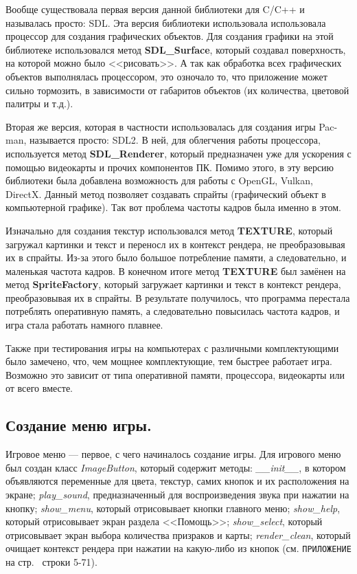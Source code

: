 Вообще существовала первая версия данной библиотеки для C/C++ и называлась просто: SDL. Эта версия библиотеки использовала использовала процессор для создания графических объектов.
Для создания графики на этой библиотеке использовался метод \textbf{SDL\_Surface}, который создавал поверхность, на которой можно было <<рисовать>>. А так как обработка всех графических объектов выполнялась процессором, это озночало то, что приложение может сильно тормозить, в зависимости от габаритов объектов (их количества, цветовой палитры и т.д.).

Вторая же версия, которая в частности использовалась для создания игры Pac-man, называется просто: SDL2. В ней, для облегчения работы процессора, используется метод \textbf{SDL\_Renderer},
который предназначен уже для ускорения с помощью видеокарты и прочих компонентов ПК. Помимо этого, в эту версию библиотеки была добавлена возможность для работы с OpenGL, Vulkan, DirectX.
Данный метод позволяет создавать спрайты (графический объект в компьютерной графике). Так вот проблема частоты кадров была именно в этом.

Изначально для создания текстур использовался метод \textbf{TEXTURE}, который загружал картинки и текст и переносл их в контекст рендера, не преобразовывая их в спрайты. Из-за этого было большое
потребление памяти, а следовательно, и маленькая частота кадров. В конечном итоге метод \textbf{TEXTURE} был замёнен на метод \textbf{SpriteFactory}, который загружает картинки и текст в контекст рендера, преобразовывая их в спрайты. В результате получилось, что программа перестала потреблять оперативную память, а следовательно повысилась частота кадров, и игра стала работать намного плавнее.

Также при тестирования игры на компьютерах с различными комплектующими было замечено, что, чем мощнее комплектующие, тем быстрее работает игра. Возможно это зависит от типа оперативной памяти, процессора, видеокарты или от всего вместе.

\subsection{\label{subsec:ch02/sec01/sub03}Создание меню игры.}
Игровое меню --- первое, с чего начиналось создание игры. Для игрового меню был создан класс \textit{ImageButton}, который содержит методы: \textit{\_\_init\_\_}, в котором объявляются переменные для цвета, текстур, самих кнопок и их расположения на экране; \textit{play\_sound}, предназначенный для воспроизведения звука при нажатии на кнопку; \textit{show\_menu}, который отрисовывает кнопки главного меню; \textit{show\_help}, который отрисовывает экран раздела <<Помощь>>; \textit{show\_select}, который отрисовывает экран выбора количества призраков и карты; \textit{render\_clean}, который очищает контекст рендера при нажатии на какую-либо из кнопок (см. \texttt{ПРИЛОЖЕНИЕ} на стр.~\pageref{code:menu} строки 5-71).

